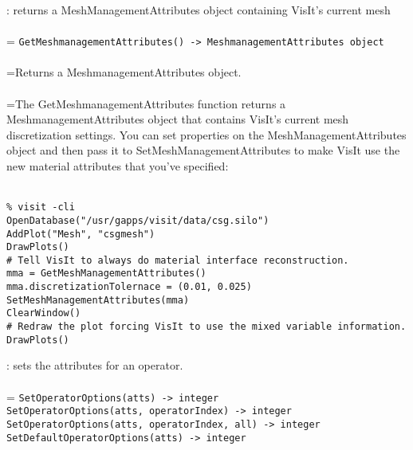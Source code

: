 \documentclass[10pt,a4paper]{report}
\begin{document}
{}
: returns a MeshManagementAttributes object containing VisIt's current mesh\\[-3mm]

 \\ 
\hangindent=\parindent 
\verb!GetMeshmanagementAttributes() -> MeshmanagementAttributes object!\\ [-3mm]

 \\ 
\hangindent=\parindent Returns a MeshmanagementAttributes object. \\[-3mm] 

 \\ 
\hangindent=\parindent The GetMeshmanagementAttributes function returns a MeshmanagementAttributes object that contains VisIt's current mesh discretization settings. You can set properties on the MeshManagementAttributes object and then pass it to SetMeshManagementAttributes to make VisIt use the new material attributes that you've specified: \\[-3mm] 

\\[-6mm]
\begin{verbatim}% visit -cli
OpenDatabase("/usr/gapps/visit/data/csg.silo")
AddPlot("Mesh", "csgmesh")
DrawPlots()
# Tell VisIt to always do material interface reconstruction.
mma = GetMeshManagementAttributes()
mma.discretizationTolernace = (0.01, 0.025)
SetMeshManagementAttributes(mma)
ClearWindow()
# Redraw the plot forcing VisIt to use the mixed variable information.
DrawPlots()
\end{verbatim}
\newpage


{}
: sets the attributes for an operator.\\[-3mm]

 \\ 
\hangindent=\parindent 
\verb!SetOperatorOptions(atts) -> integer!\\ 
\verb!SetOperatorOptions(atts, operatorIndex) -> integer!\\ 
\verb!SetOperatorOptions(atts, operatorIndex, all) -> integer!\\ 
\verb!SetDefaultOperatorOptions(atts) -> integer!\\ [-3mm]
\end{document}
